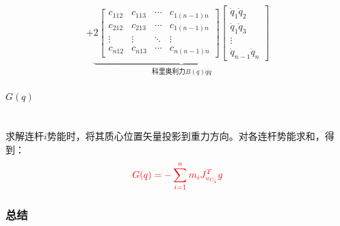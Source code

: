 \documentclass[
12pt, %
a4paper, 
oneside, %
]{scrartcl}
\begin{document}
\begin{itemize}
$${+ \underbrace{2\begin{bmatrix} c_{112} & c_{113} & \cdots & c_{1(n - 1)n} \\ c_{212} & c_{213} & \cdots & c_{1(n - 1)n} \\ \vdots & \vdots & \ddots & \vdots \\ c_{n12} & c_{n13} & \cdots & c_{n(n - 1)n} \end{bmatrix} \begin{bmatrix} \dot{q}_1 \dot{q}_2 \\ \dot{q}_1 \dot{q}_3 \\ \vdots \\ \dot{q}_{n - 1} \dot{q}_n \end{bmatrix}}_{\text{科里奥利力}B(q) \dot{q} \dot{q}}
} $$
\end{itemize}
\paragraph{$ G(q) $}~\\

求解连杆$ i $势能时，将其质心位置矢量投影到重力方向。对各连杆势能求和，得到：
$$ \textcolor{red}{G(q) = -\sum_{i = 1}^{n} m_i J_{v_{C_i}}^T g} $$
\subsubsection[总结]{总结}
\end{document}

